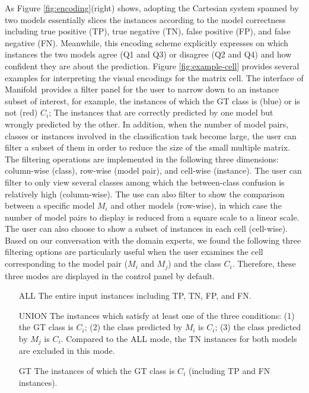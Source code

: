 \documentclass[preprint,journal]{vgtc}       %
\newcommand{\techname}{Manifold}
\begin{document}
As Figure \ref{fig:encoding}(right) shows, adopting the Cartesian system spanned by two models essentially slices the instances according to the model correctness including true positive (TP), true negative (TN), false positive (FP), and false negative (FN). Meanwhile, this encoding scheme explicitly expresses on which instances the two models agree (Q1 and Q3) or disagree (Q2 and Q4) and how confident they are about the prediction. Figure \ref{fig:example-cell} provides several examples for interpreting the visual encodings for the matrix cell. The interface of \techname\ provides a filter panel for the user to narrow down to an instance subset of interest, for example, the instances of which the GT class is (blue) or is not (red) $C_i$; The instances that are correctly predicted by one model but wrongly predicted by the other. In addition, when the number of model pairs, classes or instances involved in the classification task become large, the user can filter a subset of them in order to reduce the size of the small multiple matrix. The filtering operations are implemented in the following three dimensions: column-wise (class), row-wise (model pair), and cell-wise (instance). The user can filter to only view several classes among which the between-class confusion is relatively high (column-wise). The use can also filter to show the comparison between a specific model $M_i$ and other models (row-wise), in which case the number of model pairs to display is reduced from a square scale to a linear scale. The user can also choose to show a subset of instances in each cell (cell-wise). Based on our conversation with the domain experts, we found the following three filtering options are particularly useful when the user examines the cell corresponding to the model pair ($M_i$ and $M_j$) and the class $C_i$. Therefore, these three modes are displayed in the control panel by default.

\begin{itemize}[leftmargin=.4in,itemsep=0em,topsep=0pt]
  \item[ALL] The entire input instances including TP, TN, FP, and FN.
  \item[UNION] The instances which satisfy at least one of the three conditions: (1) the GT class is $C_i$; (2) the class predicted by $M_i$ is $C_i$; (3) the class predicted by $M_j$ is $C_i$. Compared to the ALL mode, the TN instances for both models are excluded in this mode.
  \item[GT] The instances of which the GT class is $C_i$ (including TP and FN instances).
\end{itemize}
\end{document}
